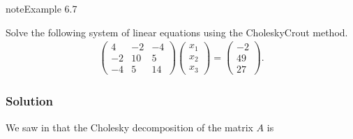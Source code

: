 \documentclass[letterpaper,10pt,english]{jupyterBook}
\begin{document}
\begin{sphinxadmonition}{note}{Example 6.7}

\sphinxAtStartPar
Solve the following system of linear equations using the Cholesky\sphinxhyphen{}Crout method.
\begin{align*}
    \begin{pmatrix}
        4 & -2 & -4\\
        -2 & 10 & 5\\
        -4 & 5 & 14
    \end{pmatrix}
    \begin{pmatrix}
        x_1 \\ x_2 \\ x_3 \end{pmatrix} =
    \begin{pmatrix} -2 \\ 49 \\ 27 \end{pmatrix}.
\end{align*}\subsubsection*{Solution}

\sphinxAtStartPar
We saw in {\hyperref[\detokenize{6_Direct_methods/6.3_Cholesky_decomposition:cholesky-example}]{}} that the Cholesky decomposition of the matrix \(A\) is


\end{sphinxadmonition}
\end{document}
